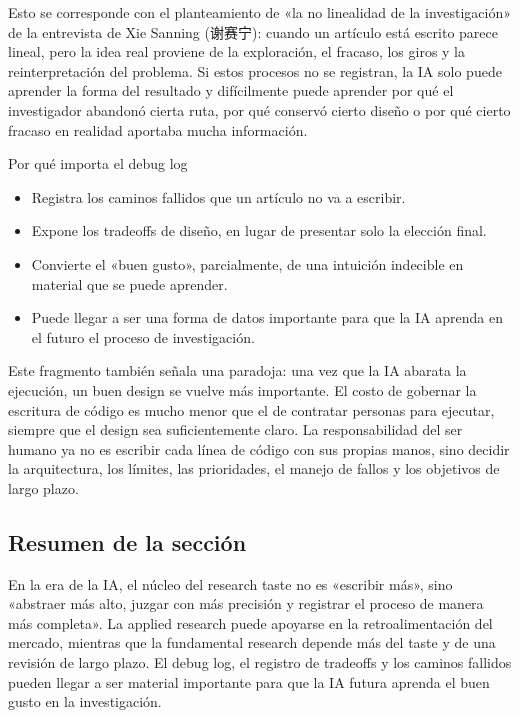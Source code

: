 \documentclass[a4paper]{article}
\begin{document}
Esto se corresponde con el planteamiento de «la no linealidad de la investigación» de la entrevista de Xie Sanning (谢赛宁): cuando un artículo está escrito parece lineal, pero la idea real proviene de la exploración, el fracaso, los giros y la reinterpretación del problema. Si estos procesos no se registran, la IA solo puede aprender la forma del resultado y difícilmente puede aprender por qué el investigador abandonó cierta ruta, por qué conservó cierto diseño o por qué cierto fracaso en realidad aportaba mucha información.

\begin{knowledgebox}{Por qué importa el debug log}
\begin{itemize}
  \item Registra los caminos fallidos que un artículo no va a escribir.
  \item Expone los tradeoffs de diseño, en lugar de presentar solo la elección final.
  \item Convierte el «buen gusto», parcialmente, de una intuición indecible en material que se puede aprender.
  \item Puede llegar a ser una forma de datos importante para que la IA aprenda en el futuro el proceso de investigación.
\end{itemize}
\end{knowledgebox}

Este fragmento también señala una paradoja: una vez que la IA abarata la ejecución, un buen design se vuelve más importante. El costo de gobernar la escritura de código es mucho menor que el de contratar personas para ejecutar, siempre que el design sea suficientemente claro. La responsabilidad del ser humano ya no es escribir cada línea de código con sus propias manos, sino decidir la arquitectura, los límites, las prioridades, el manejo de fallos y los objetivos de largo plazo.

\subsection{Resumen de la sección}

En la era de la IA, el núcleo del research taste no es «escribir más», sino «abstraer más alto, juzgar con más precisión y registrar el proceso de manera más completa». La applied research puede apoyarse en la retroalimentación del mercado, mientras que la fundamental research depende más del taste y de una revisión de largo plazo. El debug log, el registro de tradeoffs y los caminos fallidos pueden llegar a ser material importante para que la IA futura aprenda el buen gusto en la investigación.
\end{document}
